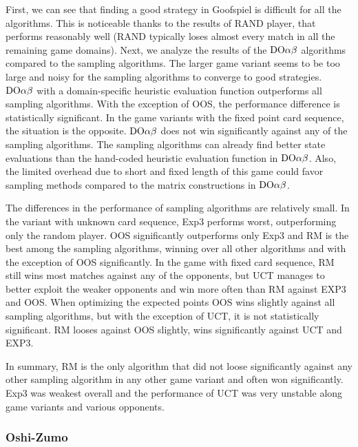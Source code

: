 First, we can see that finding a good strategy in Goofspiel is difficult for all the algorithms.
This is noticeable thanks to the results of RAND player, that performs reasonably well
(RAND typically loses almost every match in all the remaining game domains).
Next, we analyze the results of the $\textrm{DO}\alpha\beta$ algorithms compared to the sampling algorithms.
The larger game variant seems to be too large and noisy for the sampling algorithms to converge to good strategies.
$\textrm{DO}\alpha\beta$ with a domain-specific heuristic evaluation function outperforms all sampling algorithms.
With the exception of OOS, the performance difference is statistically significant.
In the game variants with the fixed point card sequence, the situation is the opposite.
$\textrm{DO}\alpha\beta$ does not win significantly against any of the sampling algorithms.
The sampling algorithms can already find better state evaluations than the hand-coded heuristic evaluation function in $\textrm{DO}\alpha\beta$.
Also, the limited overhead due to short and fixed length of this game could favor sampling methods compared to the
matrix constructions in $\textrm{DO}\alpha\beta$.

The differences in the performance of sampling algorithms are relatively small.
In the variant with unknown card sequence, Exp3 performs worst, outperforming only the random player.
OOS significantly outperforms only Exp3 and RM is the best among the sampling algorithms, winning over all other algorithms and with the exception of OOS significantly.
In the game with fixed card sequence, RM still wins most matches against any of the opponents, but UCT manages to better exploit the weaker opponents and win more often than RM against EXP3 and OOS.
When optimizing the expected points OOS wins slightly against all sampling algorithms, but with the exception of UCT, it is not statistically significant. RM looses against OOS slightly, wins significantly against UCT and EXP3.

In summary, RM is the only algorithm that did not loose significantly against any other sampling algorithm in any other game variant and often won significantly. Exp3 was weakest overall and the performance of UCT was very unstable along game variants and various opponents.


\subsubsection{Oshi-Zumo}

